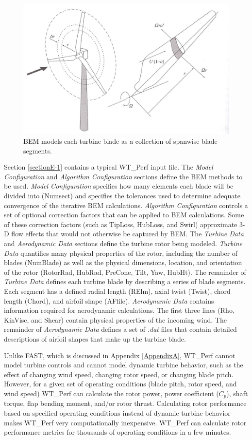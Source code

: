 \begin{figure}[ht]
	\centering
		\includegraphics[width=.75\textwidth]{Figures/AppendixEFigures/figE-1.png}
	\caption{BEM models each turbine blade as a collection of spanwise blade segments.\cite{burton2011}}
	\label{figE-1}
\end{figure}


Section \ref{sectionE-1} contains a typical WT\_Perf input file. The \textit{Model Configuration} and \textit{Algorithm Configuration} sections define the BEM methods to be used. \textit{Model Configuration} specifies how many elements each blade will be divided into (Numsect) and specifies the tolerances used to determine adequate convergence of the iterative BEM calculations. \textit{Algorithm Configuration} controls a set of optional correction factors that can be applied to BEM calculations. Some of these correction factors (such as TipLoss, HubLoss, and Swirl) approximate 3-D flow effects that would not otherwise be captured by BEM. The \textit{Turbine Data} and \textit{Aerodynamic Data} sections define the turbine rotor being modeled. \textit{Turbine Data} quantifies many physical properties of the rotor, including the number of blades (NumBlade) as well as the physical dimensions, location, and orientation of the rotor (RotorRad, HubRad, PreCone, Tilt, Yaw, HubHt). The remainder of \textit{Turbine Data} defines each turbine blade by describing a series of blade segments. Each segment has a defined radial length (RElm), axial twist (Twist), chord length (Chord), and airfoil shape (AFfile). \textit{Aerodynamic Data} contains information required for aerodynamic calculations. The first three lines (Rho, KinVisc, and Shear) contain physical properties of the incoming wind. The remainder of \textit{Aerodynamic Data} defines a set of \textit{.dat} files that contain detailed descriptions of airfoil shapes that make up the turbine blade. 

Unlike FAST, which is discussed in Appendix \ref{AppendixA}, WT\_Perf cannot model turbine controls and cannot model dynamic turbine behavior, such as the effect of changing wind speed, changing rotor speed, or changing blade pitch. However, for a given set of operating conditions (blade pitch, rotor speed, and wind speed) WT\_Perf can calculate the rotor power, power coefficient ($C_p$), shaft torque, flap bending moment, and/or rotor thrust. Calculating rotor performance based on specified operating conditions instead of dynamic turbine behavior makes WT\_Perf very computationally inexpensive. WT\_Perf can calculate rotor performance metrics for thousands of operating conditions in a few minutes.  

